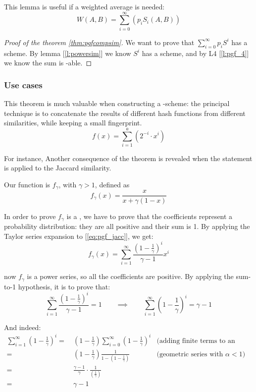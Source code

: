 This lemma is useful if a weighted average is needed:
\[
    W(A,B) = \sum_{i=0}^{\infty}(p_i S_i(A, B))
\]

\begin{proof}[Proof of the theorem \ref{thm:pgfcompsim}]
    We want to prove that $\sum_{i = 0}^{\infty} p_i S^i$ has a scheme. By lemma [\ref{l:powersim}] we know $S^i$ has a scheme, and by L4 [\ref{l:pgf_4}] we know the sum is \lsh-able.
\end{proof}


\subsubsection{Use cases}

This theorem is much valuable when constructing a \lsh-scheme: the principal technique is to concatenate the results of different hash functions from different similarities, while keeping a small fingerprint.
\[
    f(x) = \sum_{i=1}^{a}(2^{-i} \cdot x^i)
\]

For instance, Another consequence of the theorem is revealed when the statement is applied to the Jaccard similarity.

Our function is $f_\gamma$, with $\gamma > 1$, defined as
\begin{equation} \label{eq:pgf_jacc}
    f_\gamma(x) = \frac{x}{x + \gamma(1 - x)}
\end{equation}

In order to prove $f_\gamma$ is a \pgf, we have to prove that the coefficients represent a probability distribution: they are all positive and their sum is 1. By applying the Taylor series expansion to [\ref{eq:pgf_jacc}], we get:
\[
    f_\gamma(x) = \sum_{i = 1}^{\infty} \frac{ \left( 1 - \frac{1}{\gamma} \right)^i }{\gamma - 1} x^i
\]

now $f_\gamma$ is a power series, so all the coefficients are positive. By applying the sum-to-1 hypothesis, it is to prove that:
\[
    \sum_{i = 1}^{\infty} \frac{ \left( 1 - \frac{1}{\gamma} \right)^i }{\gamma - 1} = 1 \qquad \implies \qquad \sum_{i = 1}^{\infty} \left( 1 - \frac{1}{\gamma} \right)^i = \gamma - 1
\]

And indeed:
\begin{align*}
        \sum_{i = 1}^{\infty} \left(1 - \frac{1}{\gamma} \right)^i
    =&\ \left( 1 - \frac{1}{\gamma} \right) \sum_{i = 0}^{\infty} \left( 1 - \frac{1}{\gamma} \right)^i & \text{(adding finite terms to an infinite series)} \\
    =&\ \left( 1 - \frac{1}{\gamma} \right) \frac{1}{1 - \left( 1 - \frac{1}{\gamma} \right)}           & \text{(geometric series with $\alpha < 1$)} \\
    =&\ \frac{\gamma - 1}{\gamma} \cdot \frac{1}{ \left( \frac{1}{\gamma} \right) }                     & \\
    =&\ \gamma - 1                                                                                      &
\end{align*}

